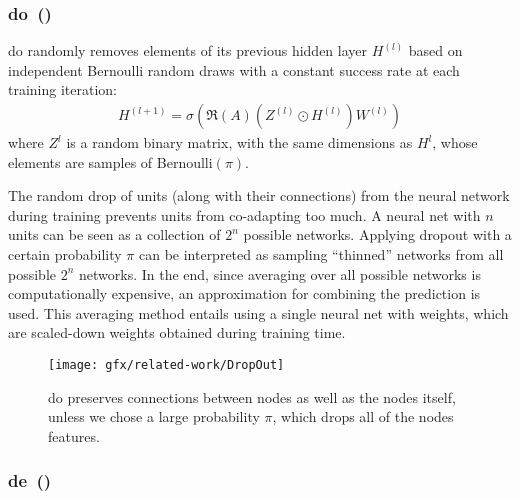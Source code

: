 \subsubsection{\acl*{do}~(\citeauthor{Srivastava2014})}
\label{sec:related:pred:regularization:do}

\ac{do}\cite{Srivastava2014} randomly removes elements of its previous hidden
layer $H^{(l)}$ based on independent Bernoulli random draws with a constant success rate at each
training iteration:
\begin{align*}
    H^{(l+1)} = \sigma(\mathfrak{R}(A)(Z^{(l)}\odot H^{(l)}) W^{(l)})
\end{align*}
where $Z^{l}$ is a random binary matrix, with the same dimensions as $H^{l}$, whose
elements are samples of Bernoulli$(\pi)$.

The random drop of units (along with their connections) from the neural
network during training prevents units from co-adapting too much.
A neural net with $n$ units can be seen as a collection of $2^{n}$ possible networks.
Applying dropout with a certain probability $\pi$ can be interpreted as sampling
``thinned'' networks from all possible $2^{n}$ networks. In the end, since averaging over
all possible networks is computationally expensive, an approximation for
combining the prediction is used. This averaging method entails using
a single neural net with weights, which are scaled-down weights obtained during
training time. %
\begin{figure}[ht]
    \centering
    \texttt{[image: gfx/related-work/DropOut]}
    \caption{\acf{do} preserves connections between nodes as well as the
        nodes itself, unless we chose a large probability $\pi$, which drops all of the nodes
        features.}\label{fig:related:DropOut}
\end{figure}
\subsubsection{\acl*{de}~(\citeauthor{Rong2020})}
\label{sec:related:pred:regularization:de}


